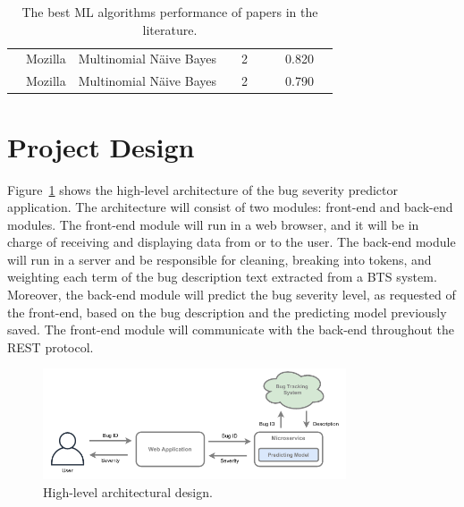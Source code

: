 \documentclass[a4paper]{article}
\begin{document}
\begin{table}[htp]
\begin{tabular}{@{}p{}p{}p{}p{}ccccc@{}}
        \cmidrule{1-9}
        \cite{Jin:2016b}                    &  Mozilla                          &  Multinomial Näive Bayes                       &  & 2 &                                     &                   &  0.820             &                                           \\ 
        \cmidrule{1-9}
        \cite{Jin:2016c}                    &  Mozilla                          &  Multinomial Näive Bayes                        &  & 2 &                                     &     &  0.790             &                                           \\ 
        \bottomrule
        \end{tabular}
        \caption{The best ML algorithms performance of papers in the literature.}
        \label{tab:performance_of_algorithms}
    \end{table}

\noindent{}

\section{Project Design}
Figure~\ref{fig:application-architecture} shows the high-level architecture of the bug severity predictor application. The architecture will consist of two modules: front-end and back-end modules. The front-end module will run in a web browser, and it will be in charge of receiving and displaying data from or to the user. The back-end module will run in a server and be responsible for cleaning, breaking into tokens, and weighting each term of the bug description text extracted from a BTS system. Moreover, the back-end module will predict the bug severity level, as requested of the front-end, based on the bug description and the predicting model previously saved. The front-end module will communicate with the back-end throughout the REST protocol. 
\begin{figure}[h!]
    \centering
    \includegraphics[width=0.8\textwidth]{figures/architecture-overview.png}
    \caption{High-level architectural design.}
    \label{fig:application-architecture}
\end{figure}
\end{document}
